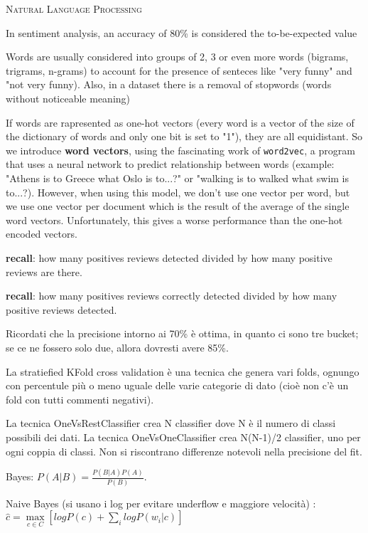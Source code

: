 \documentclass[a4paper,10pt]{article} %
\newcommand{\msection}[1]{%
    {\newpage\bigbreak \bigbreak \par \hfil \huge \textsc {#1}}\par}
\renewcommand{\b}[1]{%
    {\textbf{#1}}}
\renewcommand{\t}[1]{%
    {\texttt{#1}}}
\begin{document}
\msection{Natural Language Processing}
\bigbreak


\begin{multicols}{2} 

In sentiment analysis, an accuracy of 80\% is considered the to-be-expected value

Words are usually considered into groups of 2, 3 or even more words (bigrams, trigrams, n-grams) to account for the presence of senteces like "very funny" and "not very funny).  Also, in a dataset there is a removal of stopwords (words without noticeable meaning)

If words are rapresented as one-hot vectors (every word is a vector of the size of the dictionary of words and only one bit is set to "1"), they are all equidistant. So we introduce \b{word vectors}, using the fascinating work of \t{word2vec}, a program that uses a neural network to predict relationship between words (example: "Athens is to Greece what Oslo is to...?" or "walking is to walked what swim is to...?). However, when using this model, we don't use one vector per word, but we use one vector per document which is the result of the average of the single word vectors. Unfortunately, this gives a worse performance than the one-hot encoded vectors.


\b{recall}: how many positives reviews detected divided by how many positive reviews are there.

\b{recall}: how many positives reviews correctly detected divided by how many positive reviews detected.

Ricordati che la precisione intorno ai 70\% è ottima, in quanto ci sono tre bucket; se ce ne fossero solo due, allora dovresti avere 85\%.

La stratiefied KFold cross validation è una tecnica che genera vari folds, ognungo con percentule più o meno uguale delle varie categorie di dato (cioè non c'è un fold con tutti commenti negativi).

La tecnica OneVsRestClassifier crea N classifier dove N è il numero di classi possibili dei dati. La tecnica OneVsOneClassifier crea N(N-1)/2 classifier, uno per ogni coppia di classi. Non si riscontrano differenze notevoli nella precisione del fit.

Bayes: $P(A|B) = \frac{P(B|A)P(A)}{P(B)}$.

Naive Bayes (si usano i log per evitare underflow e maggiore velocità) : $\hat{c} = \max\limits_{c \in C} \left[ log P(c) + \sum\limits_{i} log P(w_i | c) \right]$


\end{multicols}
\end{document}
